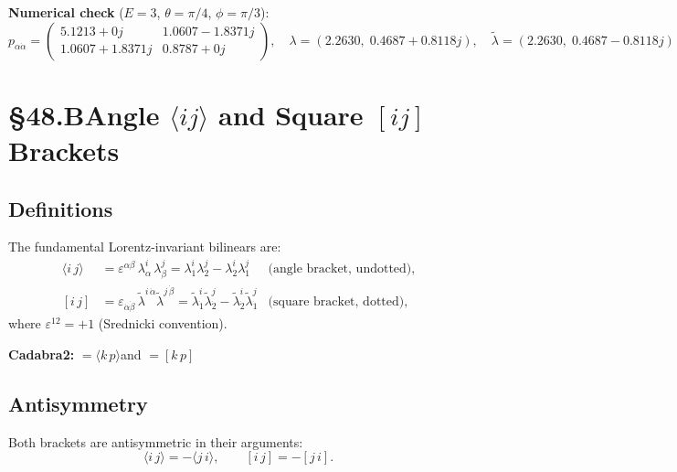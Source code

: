 \textbf{Numerical check} ($E=3$, $\theta=\pi/4$, $\phi=\pi/3$):
\[
  p_{\alpha\dot\alpha} = \begin{pmatrix}5.1213+0j & 1.0607-1.8371j \\ 1.0607+1.8371j & 0.8787+0j\end{pmatrix},
  \quad
  \lambda = (2.2630,\;0.4687+0.8118j),
  \quad
  \tilde\lambda = (2.2630,\;0.4687-0.8118j)
\]



\section{§48.B\quad Angle $\langle ij\rangle$ and Square $[ij]$ Brackets}

\subsection{Definitions}

The fundamental Lorentz-invariant bilinears are:
\begin{align}
  \langle i\,j\rangle &= \varepsilon^{\alpha\beta}\,\lambda^i_\alpha\,\lambda^j_\beta
  = \lambda^i_1\lambda^j_2 - \lambda^i_2\lambda^j_1
  & \text{(angle bracket, undotted)},
  \tag{48.4}\\[4pt]
  [i\,j] &= \varepsilon_{\dot\alpha\dot\beta}\,\tilde\lambda^{i\,\dot\alpha}\tilde\lambda^{j\,\dot\beta}
  = \tilde\lambda^i_{\dot1}\tilde\lambda^j_{\dot2} - \tilde\lambda^i_{\dot2}\tilde\lambda^j_{\dot1}
  & \text{(square bracket, dotted)},
  \tag{48.5}
\end{align}
where $\varepsilon^{12}=+1$ (Srednicki convention).

\textbf{Cadabra2:}\quad
{} $= \langle k\,p\rangle$\quad and\quad
{} $= [k\,p]$

\subsection{Antisymmetry}

Both brackets are antisymmetric in their arguments:
\begin{equation}
  \langle i\,j\rangle = -\langle j\,i\rangle,
  \qquad
  [i\,j] = -[j\,i].
  \tag{48.6}
\end{equation}

